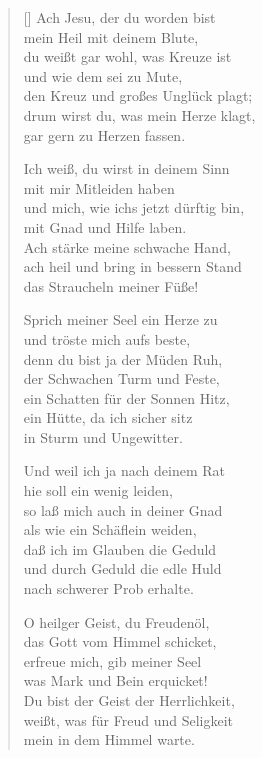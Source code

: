 \begin{multicols}{2}
\begin{verse}[\versewidth]
 Ach Jesu, der du worden bist\\
mein Heil mit deinem Blute,\\
du weißt gar wohl, was Kreuze ist\\
und wie dem sei zu Mute,\\
den Kreuz und großes Unglück plagt;\\
drum wirst du, was mein Herze klagt,\\
gar gern zu Herzen fassen.

 Ich weiß, du wirst in deinem Sinn\\
mit mir Mitleiden haben\\
und mich, wie ichs jetzt dürftig bin,\\
mit Gnad und Hilfe laben.\\
Ach stärke meine schwache Hand,\\
ach heil und bring in bessern Stand\\
das Straucheln meiner Füße!

 Sprich meiner Seel ein Herze zu\\
und tröste mich aufs beste,\\
denn du bist ja der Müden Ruh,\\
der Schwachen Turm und Feste,\\
ein Schatten für der Sonnen Hitz,\\
ein Hütte, da ich sicher sitz\\
in Sturm und Ungewitter.

 Und weil ich ja nach deinem Rat\\
hie soll ein wenig leiden,\\
so laß mich auch in deiner Gnad\\
als wie ein Schäflein weiden,\\
daß ich im Glauben die Geduld\\
und durch Geduld die edle Huld\\
nach schwerer Prob erhalte.

 O heilger Geist, du Freudenöl,\\
das Gott vom Himmel schicket,\\
erfreue mich, gib meiner Seel\\
was Mark und Bein erquicket!\\
Du bist der Geist der Herrlichkeit,\\
weißt, was für Freud und Seligkeit\\
mein in dem Himmel warte.


\end{verse}
\end{multicols}
